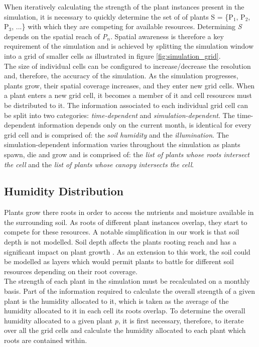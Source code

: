 When iteratively calculating the strength of the plant instances present in the simulation, it is necessary to quickly determine the set of of plants S = \{P$_{1}$, P$_{2}$, P$_{3}$, ...\} with which they are competing for available resources. Determining \textit{S} depends on the spatial reach of \textit{P$_{n}$}. Spatial awareness is therefore a key requirement of the simulation and is achieved by splitting the simulation window into a grid of smaller cells as illustrated in figure \ref{fig:simulation_grid}.\\
The size of individual cells can be configured to increase/decrease the resolution and, therefore, the accuracy of the simulation. As the simulation progresses, plants grow, their spatial coverage increases, and they enter new grid cells. When a plant enters a new grid cell, it becomes a member of it and cell resources must be distributed to it. The information associated to each individual grid cell can be split into two categories: \textit{time-dependent} and \textit{simulation-dependent}. The time-dependent information depends only on the current month, is identical for every grid cell and is comprised of: the \textit{soil humidity} and the \textit{illumination}. The simulation-dependent information varies throughout the simulation as plants spawn, die and grow and is comprised of: the \textit{list of plants whose roots intersect the cell} and the \textit{list of plants whose canopy intersects the cell}.

\subsection{Humidity Distribution}

Plants grow there roots in order to access the nutrients and moisture available in the surrounding soil. As roots of different plant instances overlap, they start to compete for these resources. A notable simplification in our work is that soil depth is not modelled. Soil depth affects the plants rooting reach and has a significant impact on plant growth \cite{Fourcaud2008}. As an extension to this work, the soil could be modelled as layers which would permit plants to battle for different soil resources depending on their root coverage.\\

The strength of each plant in the simulation must be recalculated on a monthly basis. Part of the information required to calculate the overall strength of a given plant is the humidity allocated to it, which is taken as the average of the humidity allocated to it in each cell its roots overlap. To determine the overall humidity allocated to a given plant \textit{p}, it is first necessary, therefore, to iterate over all the grid cells and calculate the humidity allocated to each plant which roots are contained within.\\

